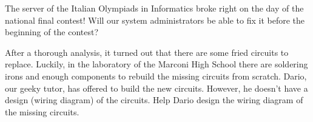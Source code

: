 \usepackage{xcolor}
\usepackage{afterpage}
\usepackage{float}
\usepackage{caption}
\usepackage{tabularx}
\usepackage{pifont,mdframed}
\usepackage[bottom]{footmisc}
\usepackage{listings}
\usepackage{multicol}

\lstset{
	columns=flexible,
	basicstyle=\small\ttfamily,
	mathescape=true,
	escapeinside=||
}


\renewcommand{\inputfile}{\texttt{stdin}}
\renewcommand{\outputfile}{\texttt{stdout}}
\makeatletter
\renewcommand{\this@inputfilename}{\texttt{input}}
\renewcommand{\this@outputfilename}{\texttt{output}}
\makeatother

\newenvironment{warning}
  {\par\begin{mdframed}[linewidth=2pt,linecolor=gray]%
    \begin{list}{}{\leftmargin=1cm
                   \labelwidth=\leftmargin}\item[\Large\ding{43}]}
  {\end{list}\end{mdframed}\par}
\newenvironment{danger}
{\par\begin{mdframed}[linewidth=2pt,linecolor=red!60!yellow,backgroundcolor=red!20!white]%
		\begin{list}{}{\leftmargin=1cm
				\labelwidth=\leftmargin}\item[\Large\ding{45}]}
		{\end{list}\end{mdframed}\par}


The server of the Italian Olympiads in Informatics broke right on the day of the national final contest! Will our system administrators be able to fix it before the beginning of the contest?

After a thorough analysis, it turned out that there are some fried circuits to replace. Luckily, in the laboratory of the Marconi High School there are soldering irons and enough components to rebuild the missing circuits from scratch.
Dario, our geeky tutor, has offered to build the new circuits. However, he doesn't have a design (wiring diagram) of the circuits. Help Dario design the wiring diagram of the missing circuits.

